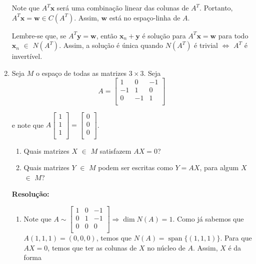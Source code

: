 \documentclass[leqno]{article}
\DeclareMathOperator{\spn}{span}
\begin{document}
\begin{enumerate}
    Note que $A^T\textbf{x}$ será uma combinação linear das colunas de $A^T$. Portanto, $A^T\textbf{x}=\textbf{w}\in C(A^T)$. Assim, $\textbf{w}$ está no espaço-linha de $A$.
    
    Lembre-se que, se $A^T\textbf{y}=\textbf{w}$, então $\textbf{x}_n+\textbf{y}$ é solução para $A^T\textbf{x}=\textbf{w}$ para todo $\textbf{x}_n$ $\in$ $N(A^T)$. Assim, a solução é única quando $N(A^T)$ é trivial $\iff$ $A^T$ é invertível.
    
    \item Seja $M$ o espaço de todas as matrizes $3\times3$. Seja
    $$A=\begin{bmatrix}1 & 0 & -1\\-1 & 1 & 0\\0 & -1 & 1\\\end{bmatrix}$$
    
    e note que $A\begin{bmatrix}1\\1\\1\\\end{bmatrix}=\begin{bmatrix}0\\0\\0\\\end{bmatrix}$.
    
    \begin{enumerate}
        \item Quais matrizes $X$ $\in$ $M$ satisfazem $AX=0$?
        
        \item Quais matrizes $Y$ $\in$ $M$ podem ser escritas como $Y=AX$, para algum $X$ $\in$ $M$?
    \end{enumerate}
    
    \textbf{Resolução:}
    
    \begin{enumerate}
        \item Note que $A\sim \begin{bmatrix}
            1 & 0 & -1\\
            0 & 1 & -1\\
            0 & 0 & 0\\
        \end{bmatrix}\Rightarrow\dim N(A)=1$. Como já sabemos que $A(1,1,1)=(0,0,0)$, temos que $N(A)=\spn\{(1,1,1)\}$. Para que $AX=0$, temos que ter as colunas de $X$ no núcleo de $A$. Assim, $X$ é da forma
        

\end{enumerate}
\end{enumerate}
\end{document}
